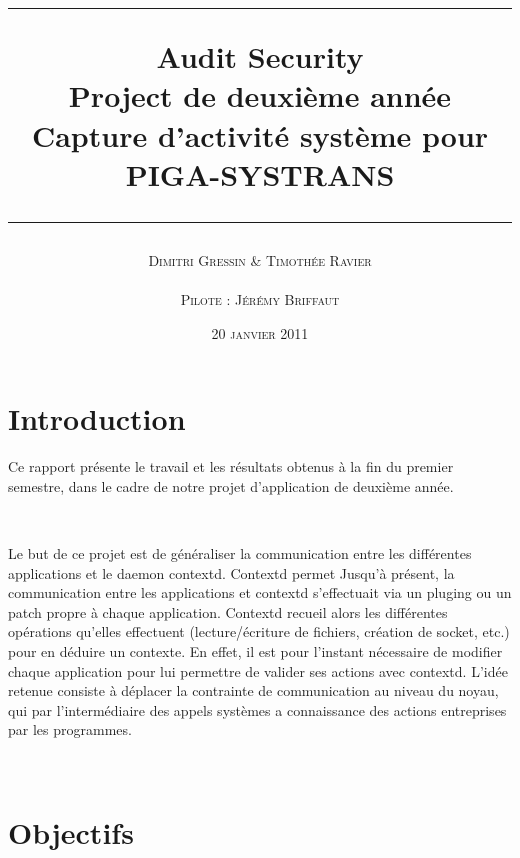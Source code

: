 \documentclass[pdftex,a4paper,titlepage,11pt,openright]{article}
\newcommand{\nom}[1]{\textsc{#1}}
\newcommand{\ligne}[1][1pt]{
  \par\noindent
  \rule[.5ex]{\linewidth}{#1}\par}
\newcommand{\clearemptydoublepage}{
	\newpage{\pagestyle{empty}\cleardoublepage}}
\begin{document}
\setlength{\parskip}{2.4ex}

\title{
\ligne{\Large}
\textbf{Audit Security}\\
\textbf{Project de deuxième année}\\
\Large Capture d'activité système pour PIGA-SYSTRANS
\ligne{\Large}
}
\author{\nom{Dimitri Gressin} \& \nom{Timothée Ravier}\\\\\nom{Pilote : Jérémy Briffaut}}
\date{20 \textsc{janvier} 2011} %

\maketitle

\clearemptydoublepage

\setcounter{secnumdepth}{2}
\setcounter{tocdepth}{2}
\tableofcontents
\addtocounter{page}{-1}

\newpage

\section*{Introduction} 
Ce rapport présente le travail et les résultats obtenus à la fin du premier semestre, dans le cadre de notre projet d'application de deuxième année.

~

Le but de ce projet est de généraliser la communication entre les différentes applications et le daemon contextd. Contextd permet 
Jusqu'à présent, la communication entre les applications et contextd s'effectuait via un pluging ou un patch propre à chaque application. Contextd recueil alors les différentes opérations qu'elles effectuent (lecture/écriture de fichiers, création de socket, etc.) pour en déduire un contexte. En effet, il est pour l'instant nécessaire de modifier chaque application pour lui permettre de valider ses actions avec contextd. L'idée retenue consiste à déplacer la contrainte de communication au niveau du noyau, qui par l'intermédiaire des appels systèmes a connaissance des actions entreprises par les programmes.

~

\section*{Objectifs} 
\end{document}
